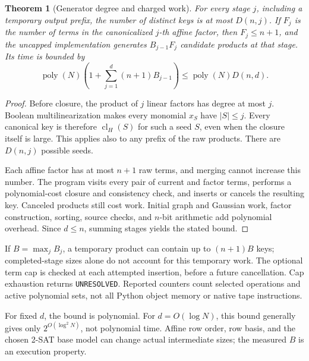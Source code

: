 \documentclass[11pt]{article}
\newtheorem{theorem}{Theorem}
\newcommand{\cl}{\operatorname{cl}}
\begin{document}
\begin{theorem}[Generator degree and charged work]
For every stage \(j\), including a temporary output prefix,
the number of distinct keys is at most \(D(n,j)\).
If \(F_j\) is the number of terms in the canonicalized \(j\)-th affine
factor, then \(F_j\le n+1\), and the uncapped implementation generates
\(B_{j-1}F_j\) candidate products at that stage.
Its time is bounded by
\[
 \operatorname{poly}(N)
 \left(1+\sum_{j=1}^{d}(n+1)B_{j-1}\right)
 \le \operatorname{poly}(N)D(n,d).
\]
\end{theorem}
\begin{proof}
Before closure, the product of \(j\) linear factors has degree at most
\(j\). Boolean multilinearization makes every monomial \(x_S\) have
\(|S|\le j\). Every canonical key is therefore \(\cl_H(S)\) for such
a seed \(S\), even when the closure itself is large. This applies also
to any prefix of the raw products. There are \(D(n,j)\) possible seeds.

Each affine factor has at most \(n+1\) raw terms, and merging cannot
increase this number. The program visits every pair of current and
factor terms, performs a polynomial-cost closure and consistency check,
and inserts or cancels the resulting key. Canceled products still cost
work. Initial graph and Gaussian work, factor construction, sorting,
source checks, and \(n\)-bit arithmetic add polynomial overhead.
Since \(d\le n\), summing stages yields the stated bound.
\end{proof}

If \(B=\max_j B_j\), a temporary product can contain up to
\((n+1)B\) keys; completed-stage sizes alone do not account for this
temporary work. The optional term cap is checked at each attempted
insertion, before a future cancellation. Cap exhaustion returns
\texttt{UNRESOLVED}. Reported counters count selected operations and
active polynomial sets, not all Python object memory or native tape
instructions.

For fixed \(d\), the bound is polynomial. For \(d=O(\log N)\), this
bound generally gives only \(2^{O(\log^2 N)}\), not polynomial time.
Affine row order, row basis, and the chosen 2-SAT base model can change
actual intermediate sizes; the measured \(B\) is an execution property.
\end{document}
